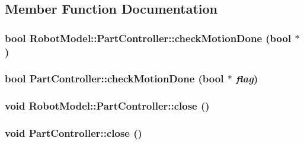 \subsection{Member Function Documentation}
\hypertarget{class_robot_model_1_1_part_controller_aeebcb6a50ff927c552f6e41cc355902b}{
\subsubsection[{checkMotionDone}]{\setlength{\rightskip}{0pt plus 5cm}bool RobotModel::PartController::checkMotionDone (bool $\ast$)}}
\label{class_robot_model_1_1_part_controller_aeebcb6a50ff927c552f6e41cc355902b}
\hypertarget{class_robot_model_1_1_part_controller_a4052252cc91ea1387d5a33c968e9a84a}{
\subsubsection[{checkMotionDone}]{\setlength{\rightskip}{0pt plus 5cm}bool PartController::checkMotionDone (bool $\ast$ {\em flag})}}
\label{class_robot_model_1_1_part_controller_a4052252cc91ea1387d5a33c968e9a84a}
\hypertarget{class_robot_model_1_1_part_controller_a2042c9595ee1dd1e87f0095bc10cc2be}{
\subsubsection[{close}]{\setlength{\rightskip}{0pt plus 5cm}void RobotModel::PartController::close ()}}
\label{class_robot_model_1_1_part_controller_a2042c9595ee1dd1e87f0095bc10cc2be}
\hypertarget{class_robot_model_1_1_part_controller_a7e0fbd5bd25cebb78cd1b095c2055dac}{
\subsubsection[{close}]{\setlength{\rightskip}{0pt plus 5cm}void PartController::close ()}}
